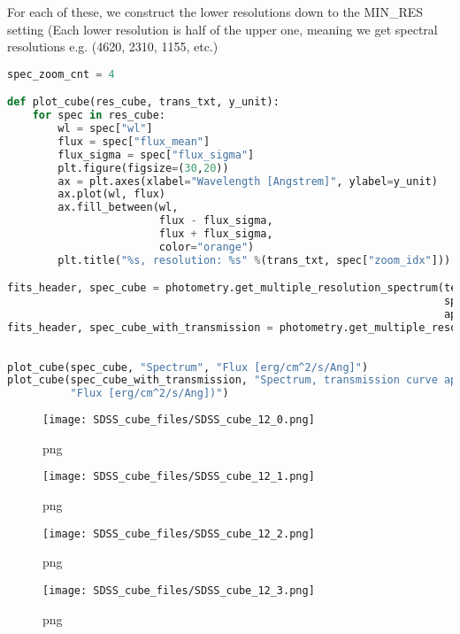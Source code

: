 For each of these, we construct the lower resolutions down to the
MIN\_RES setting (Each lower resolution is half of the upper one,
meaning we get spectral resolutions e.g. (4620, 2310, 1155, etc.)

\begin{lstlisting}[language=Python]
spec_zoom_cnt = 4

def plot_cube(res_cube, trans_txt, y_unit):
    for spec in res_cube:
        wl = spec["wl"]
        flux = spec["flux_mean"]
        flux_sigma = spec["flux_sigma"]
        plt.figure(figsize=(30,20))
        ax = plt.axes(xlabel="Wavelength [Angstrem]", ylabel=y_unit)
        ax.plot(wl, flux)
        ax.fill_between(wl, 
                        flux - flux_sigma, 
                        flux + flux_sigma, 
                        color="orange")
        plt.title("%s, resolution: %s" %(trans_txt, spec["zoom_idx"]))

fits_header, spec_cube = photometry.get_multiple_resolution_spectrum(test_spectrum,
                                                                     spec_zoom_cnt,
                                                                     apply_transmission=False)
fits_header, spec_cube_with_transmission = photometry.get_multiple_resolution_spectrum(test_spectrum,
                                                                                       spec_zoom_cnt,
                                                                                       apply_transmission=True)
plot_cube(spec_cube, "Spectrum", "Flux [erg/cm^2/s/Ang]")
plot_cube(spec_cube_with_transmission, "Spectrum, transmission curve applied", 
          "Flux [erg/cm^2/s/Ang])")      
\end{lstlisting}

\begin{figure}
\centering
\texttt{[image: SDSS\_cube\_files/SDSS\_cube\_12\_0.png]}
\caption{png}
\end{figure}

\begin{figure}
\centering
\texttt{[image: SDSS\_cube\_files/SDSS\_cube\_12\_1.png]}
\caption{png}
\end{figure}

\begin{figure}
\centering
\texttt{[image: SDSS\_cube\_files/SDSS\_cube\_12\_2.png]}
\caption{png}
\end{figure}

\begin{figure}
\centering
\texttt{[image: SDSS\_cube\_files/SDSS\_cube\_12\_3.png]}
\caption{png}
\end{figure}

